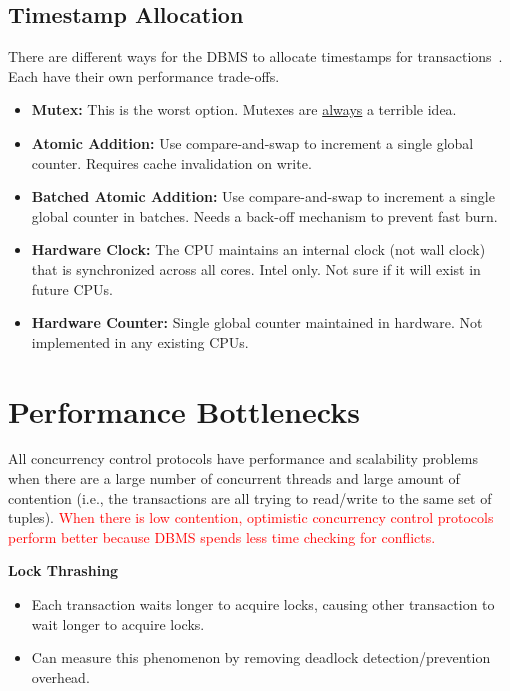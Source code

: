 \documentclass[11pt]{article}
\newcommand{\rr}[1]{\textcolor{red}{#1}}
\begin{document}
\subsection*{Timestamp Allocation}
There are different ways for the DBMS to allocate timestamps for transactions~\cite{p209-yu}. Each 
have their own performance trade-offs.
\begin{itemize}
    \item \textbf{Mutex:}
    This is the worst option. Mutexes are \underline{always} a terrible idea.
    
    \item \textbf{Atomic Addition:}
    Use compare-and-swap to increment a single global counter. Requires cache invalidation on write.
    
    \item \textbf{Batched Atomic Addition:}
    Use compare-and-swap to increment a single global counter in batches.
    Needs a back-off mechanism to prevent fast burn.

    \item \textbf{Hardware Clock:}
    The CPU maintains an internal clock (not wall clock) that is synchronized across all cores.
    Intel only. Not sure if it will exist in future CPUs.
    
    \item \textbf{Hardware Counter:}
    Single global counter maintained in hardware. Not implemented in any existing CPUs.
\end{itemize}

\section{Performance Bottlenecks}
All concurrency control protocols have performance and scalability problems when there are a large 
number of concurrent threads and large amount of contention (i.e., the transactions are all trying 
to read/write to the same set of tuples). 
\rr{When there is low contention, optimistic concurrency control protocols perform better because DBMS spends less time checking for conflicts.}

\textbf{Lock Thrashing}
\begin{itemize}
    \item
    Each transaction waits longer to acquire locks, causing other transaction to wait longer to 
    acquire locks.
    
    \item
    Can measure this phenomenon by removing deadlock detection/prevention overhead.
\end{itemize}
    
\end{document}
